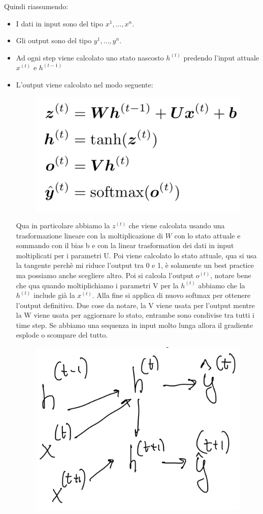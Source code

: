 \documentclass[14pt]{extreport}
\begin{document}
Quindi riassumendo:

\begin{itemize}
	\item I dati in input sono del tipo $x^{1},...,x^{n}$.
	\item Gli output sono del tipo $y^{1},..., y^{n}$.
	\item Ad ogni step viene calcolato uno stato nascosto $h^{(t)}$ predendo l'input attuale $x^{(t)}$ e $h^{(t-1)}$
	\item L'output viene calcolato nel modo seguente:
	      \begin{figure}[H]
		      \centering
		      \includegraphics[width=0.7\linewidth]{417.jpeg}
	      \end{figure}
	      Qua in particolare abbiamo la $z^{(t)}$ che viene calcolata usando una trasformazione lineare con la moltiplicazione di $W$ con lo stato
	      attuale e sommando con il bias b e con la linear trasformation dei dati in input moltiplicati per i parametri U. Poi viene calcolato lo
	      stato attuale, qua si usa la tangente perchè mi riduce l'output tra 0 e 1, è solamente un best practice ma possiamo anche scegliere altro.
	      Poi si calcola l'output $o^{(t)}$, notare bene che qua quando moltiplichiamo i parametri V per la $h^{(t)}$ abbiamo che la $h^{(t)}$ include
	      già la $x^{(t)}$. Alla fine si applica di nuovo softmax per ottenere l'output definitivo. Due cose da notare, la V viene usata per l'output
	      mentre la W viene usata per aggiornare lo stato, entrambe sono condivise tra tutti i time step. Se abbiamo una sequenza in input molto lunga
	      allora il gradiente esplode o scompare del tutto.
	      \begin{figure}[H]
		      \centering
		      \includegraphics[width=0.7\linewidth]{418.jpeg}
	      \end{figure}
\end{itemize}
\end{document}
